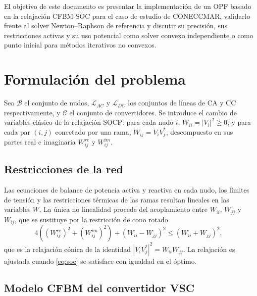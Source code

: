 \documentclass[12pt,a4paper]{iit-project-draft-report}
\begin{document}
El objetivo de este documento es presentar la implementación de un
\gls{OPF} basado en la relajación \gls{CFBM}-\gls{SOC} para el caso de
estudio de CONECCMAR, validarlo frente al solver Newton--Raphson de
referencia y discutir su precisión, sus restricciones activas y su uso
potencial como solver convexo independiente o como punto inicial para
métodos iterativos no convexos.

\section{Formulación del problema}
\label{sec:formulation}

Sea $\mathcal{B}$ el conjunto de nudos, $\mathcal{L}_{AC}$ y
$\mathcal{L}_{DC}$ los conjuntos de líneas de \gls{CA} y \gls{CC}
respectivamente, y $\mathcal{C}$ el conjunto de convertidores. Se introduce
el cambio de variables clásico de la relajación \gls{SOCP}: para cada nudo
$i$, $W_{ii} = |V_i|^2 \ge 0$; y para cada par $(i,j)$ conectado por una
rama, $W_{ij} = V_i V_j^{*}$, descompuesto en sus partes real e imaginaria
$W^{re}_{ij}$ y $W^{im}_{ij}$.

\subsection{Restricciones de la red}

Las ecuaciones de balance de potencia activa y reactiva en cada nudo, los
límites de tensión y las restricciones térmicas de las ramas resultan
lineales en las variables $W$. La única no linealidad procede del
acoplamiento entre $W_{ii}$, $W_{jj}$ y $W_{ij}$, que se sustituye por la
restricción de cono rotado
\begin{equation}
4 \left( (W^{re}_{ij})^2 + (W^{im}_{ij})^2 \right) +
\left( W_{ii} - W_{jj} \right)^2 \le \left( W_{ii} + W_{jj} \right)^2,
\label{eq:soc}
\end{equation}
que es la relajación cónica de la identidad
$|V_i V_j^{*}|^2 = W_{ii} W_{jj}$. La relajación es ajustada cuando
\eqref{eq:soc} se satisface con igualdad en el óptimo.

\subsection{Modelo CFBM del convertidor VSC}
\end{document}
